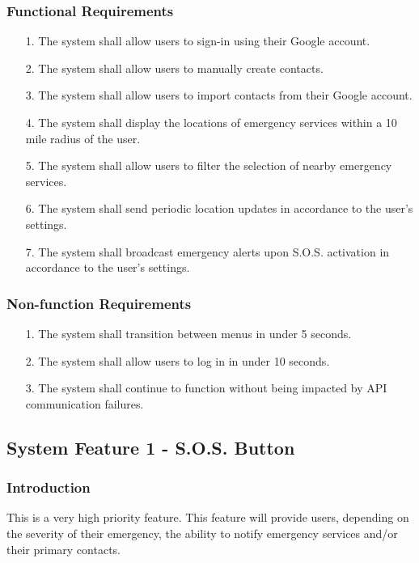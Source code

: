 \documentclass{scrreprt}
\begin{document}
\subsubsection{Functional Requirements}
\begin{enumerate}
	\item[1.] The system shall allow users to sign-in using their Google account.
	\item[2.] The system shall allow users to manually create contacts.
	\item[3.] The system shall allow users to import contacts from their Google account.
	\item[4.] The system shall display the locations of emergency services within a 10 mile radius of the user.
	\item[5.] The system shall allow users to filter the selection of nearby emergency services.
	\item[6.] The system shall send periodic location updates in accordance to the user's settings.
	\item[7.] The system shall broadcast emergency alerts upon S.O.S. activation in accordance to the user's settings.
\end{enumerate}


\subsubsection{Non-function Requirements}
\begin{enumerate}
	\item[1.] The system shall transition between menus in under 5 seconds.
	\item[2.] The system shall allow users to log in in under 10 seconds.
	\item[3.] The system shall continue to function without being impacted by API communication failures.
\end{enumerate}


\subsection{System Feature 1 - S.O.S. Button}
\subsubsection{Introduction}
This is a very high priority feature. This feature will provide users, depending on the severity of their emergency, the ability to notify emergency services and/or their primary contacts.
\end{document}
